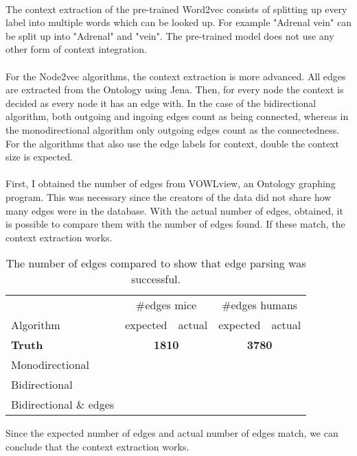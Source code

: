 \documentclass{article}
\begin{document}
  \paragraph{}
  The context extraction of the pre-trained Word2vec consists of splitting up every label into multiple words which can be looked up. For example "Adrenal vein" can be split up into "Adrenal" and "vein".
  The pre-trained model does not use any other form of context integration.
  \paragraph{}
  For the Node2vec algorithms, the context extraction is more advanced. All edges are extracted from the Ontology using Jena. Then, for every node the context is decided as every node it has an edge with. In the case of the bidirectional algorithm, both outgoing and ingoing edges count as being connected, whereas in the monodirectional algorithm only outgoing edges count as the connectedness. For the algorithms that also use the edge labels for context, double the context size is expected.
  \paragraph{}
  First, I obtained the number of edges from VOWLview\cite{vowlview}, an Ontology graphing program. This was necessary since the creators of the data did not share how many edges were in the database. With the actual number of edges, obtained, it is possible to compare them with the number of edges found. If these match, the context extraction works.
  \begin{table}[H]
  \begin{tabular}{l|ll|ll}
  & \multicolumn{2}{c}{\#edges mice} & \multicolumn{2}{c|}{\#edges humans}\\
  Algorithm & expected & actual & expected & actual\\
  \hline
  \textbf{Truth}\cite{mice_ontology} & \multicolumn{2}{c|}{\textbf{1810}} & \multicolumn{2}{c}{\textbf{3780}} \\
  Monodirectional & & & &\\
  Bidirectional & & & &\\
  Bidirectional \& edges & & & &\\
  \end{tabular}
  \caption{The number of edges compared to show that edge parsing was successful.}
  \label{edgecounts}
  \end{table}
  Since the expected number of edges and actual number of edges match, we can conclude that the context extraction works.
  
\end{document}
